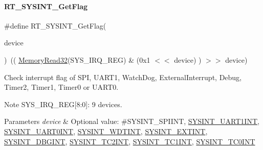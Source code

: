 \paragraph{\texorpdfstring{R\+T\+\_\+\+S\+Y\+S\+I\+N\+T\+\_\+\+Get\+Flag}{RT\_SYSINT\_GetFlag}}
{\footnotesize\ttfamily \#define R\+T\+\_\+\+S\+Y\+S\+I\+N\+T\+\_\+\+Get\+Flag(\begin{DoxyParamCaption}\item[{}]{device }\end{DoxyParamCaption})~(( \mbox{\hyperlink{a00020_a2d484dc15bdf30ee11ab3b05f31f0e16}{Memory\+Read32}}(S\+Y\+S\+\_\+\+I\+R\+Q\+\_\+\+R\+EG) \& (0x1 $<$$<$ device) ) $>$$>$ device)}



Check interrupt flag of S\+PI, U\+A\+R\+T1, Watch\+Dog, External\+Interrupt, Debug, Timer2, Timer1, Timer0 or U\+A\+R\+T0. 

\begin{DoxyNote}{Note}
S\+Y\+S\+\_\+\+I\+R\+Q\+\_\+\+R\+EG\mbox{[}8\+:0\mbox{]}\+: 9 devices. 
\end{DoxyNote}

\begin{DoxyParams}{Parameters}
{\em device} & Optional value\+: \#\+S\+Y\+S\+I\+N\+T\+\_\+\+S\+P\+I\+I\+NT, \mbox{\hyperlink{a00011_afa38f6b3d96898de1e521bf88e097a4ca0363b01262967c7900f56bf11fb3541d}{S\+Y\+S\+I\+N\+T\+\_\+\+U\+A\+R\+T1\+I\+NT}}, \mbox{\hyperlink{a00011_afa38f6b3d96898de1e521bf88e097a4ca3fce9e90d8963a30d0fdb51cd9009db9}{S\+Y\+S\+I\+N\+T\+\_\+\+U\+A\+R\+T0\+I\+NT}}, \mbox{\hyperlink{a00011_afa38f6b3d96898de1e521bf88e097a4caa245202adffe4900175deab41b6518fc}{S\+Y\+S\+I\+N\+T\+\_\+\+W\+D\+T\+I\+NT}}, \mbox{\hyperlink{a00011_afa38f6b3d96898de1e521bf88e097a4caf7b71238d06781c61f2d4894f74b12c3}{S\+Y\+S\+I\+N\+T\+\_\+\+E\+X\+T\+I\+NT}}, \mbox{\hyperlink{a00011_afa38f6b3d96898de1e521bf88e097a4ca108e51031e1626a71e03626005ee11c2}{S\+Y\+S\+I\+N\+T\+\_\+\+D\+B\+G\+I\+NT}}, \mbox{\hyperlink{a00011_afa38f6b3d96898de1e521bf88e097a4cace28a954633dd9ea0cdef0ad00fe87a2}{S\+Y\+S\+I\+N\+T\+\_\+\+T\+C2\+I\+NT}}, \mbox{\hyperlink{a00011_afa38f6b3d96898de1e521bf88e097a4ca6a6e9a3e70344b1de433dcde4bfa569d}{S\+Y\+S\+I\+N\+T\+\_\+\+T\+C1\+I\+NT}}, \mbox{\hyperlink{a00011_afa38f6b3d96898de1e521bf88e097a4ca046fae26abf2ef23f7ea24607cd837f5}{S\+Y\+S\+I\+N\+T\+\_\+\+T\+C0\+I\+NT}} \\
\hline
\end{DoxyParams}
\mbox{\label{a00011_a9c68b82296205323f01358d9a27813a9}} 
